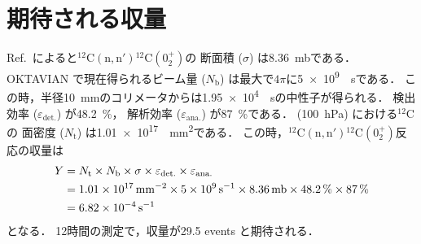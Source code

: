 \documentclass[../master]{subfiles}
\begin{document}
\section{期待される収量}
Ref.~\cite{takahashietal,kondoetal}によると${}^{12}\mathrm{C}(\mathrm{n},\mathrm{n}'){}^{12}\mathrm{C}(0_{2}^{+})$の
断面積 ($\sigma$) は\SI{8.36}{\milli\barn}である．
OKTAVIAN で現在得られるビーム量 ($N_{\text{b}}$) は最大で$4\pi$に\SI{5e9}{\per\second}である．
この時，半径\SI{10}{\milli\metre}のコリメータからは\SI{1.95e4}{\per\second}の中性子が得られる．
検出効率 ($\varepsilon_{\text{det.}}$) が\SI{48.2}{\percent}，
解析効率 ($\varepsilon_{\text{ana.}}$) が\SI{87}{\percent}である．
\isoButaneHydro (\SI{100}{\hecto\pascal}) における${}^{12}\mathrm{C}$の
面密度 ($N_{\text{t}}$) は\SI{1.01e17}{\per\square\milli\metre}である．
この時，${}^{12}\mathrm{C}(\mathrm{n},\mathrm{n}'){}^{12}\mathrm{C}(0_{2}^{+})$反応の収量は
\begin{align}
  Y &= N_{\text{t}}\times N_{\text{b}}\times \sigma \times\varepsilon_{\text{det.}}\times\varepsilon_{\text{ana.}} \notag\\
  &= \SI{1.01e17}{\per\square\milli\metre}\times\SI{5e9}{\per\second}\times\SI{8.36}{\milli\barn}
  \times\SI{48.2}{\percent}\times\SI{87}{\percent} \notag\\
  &= \SI{6.82e-4}{\per\second}
\end{align}
となる．
12時間の測定で，収量が\num{29.5} events と期待される．
\end{document}
